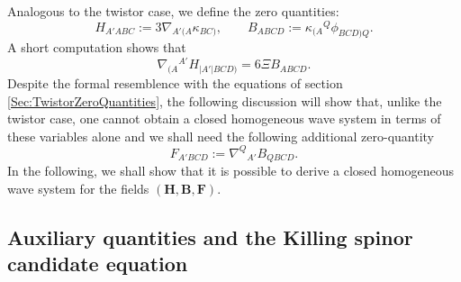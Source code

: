 \documentclass[10pt,a4paper]{article}
\theoremstyle{plain}
\def\bmB{{\bm B}}
\def\bmF{{\bm F}}
\def\bmH{{\bm H}}
\begin{document}
Analogous to the twistor case, we define the zero quantities:
\begin{equation}\label{KS_zero_quantities1}
H_{A'ABC}:=3\nabla_{A'(A}\kappa_{BC)}, \qquad
B_{ABCD}:=\kappa_{(A}{}^Q\phi_{BCD)Q}.
\end{equation}
A short computation shows that
\begin{equation}
\nabla_{(A}{}^{A'}H_{\vert A'\vert BCD)} = 6\Xi
B_{ABCD}. \label{Eq:BuchdahlAsCurlOfH}
\end{equation}
Despite the formal resemblence with the equations of section
\ref{Sec:TwistorZeroQuantities}, the following discussion will show
that, unlike the twistor case, one cannot obtain a closed homogeneous
wave system in terms of these variables alone and we shall need the
following additional zero-quantity
\begin{equation}
 F_{A'BCD}:=\nabla^Q{}_{A'}B_{QBCD}.\label{Eq:DefZeroQuantityF}
\end{equation}
In the following, we shall show that it is possible to derive a closed
homogeneous wave system for the fields $(\bmH, \bmB, \bmF)$.


\subsection{Auxiliary quantities and the Killing spinor candidate equation}
\end{document}
